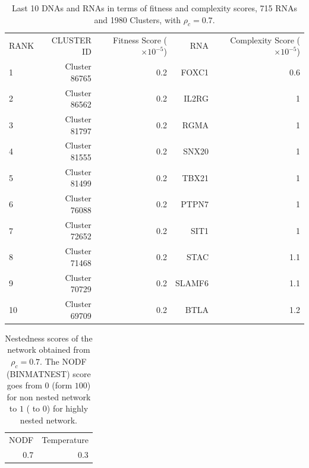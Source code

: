 \documentclass[10pt,a4paper]{article}
\begin{document}
 \begin{table}[h!]
\centering
\caption{\label{tab:tab2} Last 10 DNAs and RNAs in terms of fitness and complexity scores, 715 RNAs and 1980 Clusters, with $\rho_{c} = 0.7$.}
\begin{tabular}{l|rr|rr|}
\cline{1-5}
RANK & CLUSTER ID & Fitness Score ($\times 10^{-5}$)& RNA & Complexity Score ($\times 10^{-5}$)\\
\cline{1-5}
1 & Cluster 86765 & 0.2 & FOXC1 & 0.6\\
2 & Cluster 86562 & 0.2 & IL2RG & 1\\
3 & Cluster 81797 & 0.2 & RGMA & 1\\
4 & Cluster 81555 & 0.2 & SNX20 & 1\\
5 & Cluster 81499 & 0.2 & TBX21 & 1\\
6 & Cluster 76088 & 0.2 & PTPN7 & 1\\
7 & Cluster 72652 & 0.2 & SIT1 & 1\\
8 & Cluster 71468 & 0.2 & STAC & 1.1\\
9 & Cluster 70729 & 0.2 & SLAMF6 & 1.1\\
10 & Cluster 69709 & 0.2 & BTLA & 1.2\\
\cline{1-5}
\end{tabular}
\end{table}
\begin{table}[h!]
\centering
\caption{\label{tab:tab3}Nestedness scores of the network obtained from $\rho_{c} = 0.7$. The NODF (BINMATNEST) score goes from $0$ (form $100$) for non nested network to $1$ ( to $0$) for highly nested network.}
\begin{tabular}{|r|r|}
\cline{1-2}
NODF & Temperature\\
\cline{1-2}
0.7&0.3\\
\cline{1-2}
\end{tabular}
\end{table}
\end{document}
